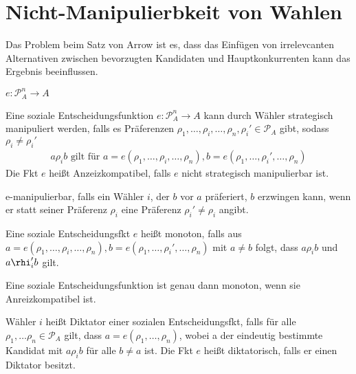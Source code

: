 \section{Nicht-Manipulierbkeit von Wahlen}
Das Problem beim Satz von Arrow ist es, dass das Einfügen von irrelevcanten Alternativen zwischen bevorzugten Kandidaten und Hauptkonkurrenten kann das Ergebnis beeinflussen. 

\begin{defi}
	$e: \mathcal{P}_A^n \rightarrow A$
\end{defi}

\begin{defi}
	Eine soziale Entscheidungsfunktion $e: \mathcal{P}_A^n \rightarrow A$ kann durch Wähler strategisch manipuliert werden, falls es Präferenzen $\rho_1, \dots, \rho_i, \dots, \rho_n, \rho_i' \in \mathcal{P}_A$ gibt, sodass $\rho_i \neq \rho_i'$ 
	\begin{align*}
		a \rho_i b \text{ gilt für }  a=e(\rho_1, \dots, \rho_i, \dots, \rho_n), b=e(\rho_1, \dots, \rho_i', \dots, \rho_n)
	\end{align*} 
	Die Fkt $e$ heißt Anzeizkompatibel, falls $e$ nicht strategisch manipulierbar ist. 
\end{defi}

\begin{rem}
	e-manipulierbar, falls ein Wähler $i$, der $b$ vor $a$ präferiert, $b$ erzwingen kann, wenn er statt seiner Präferenz $\rho_i$ eine Präferenz $\rho_i' \neq \rho_i$ angibt.  
\end{rem}

\begin{defi}[Monotonie]
	Eine soziale Entscheidungsfkt $e$ heißt monoton, falls aus 
	$ a=e(\rho_1, \dots, \rho_i, \dots, \rho_n), b=e(\rho_1, \dots, \rho_i', \dots, \rho_n)$ mit $a \neq b$ folgt, dass $a \rho_i b$ und $a \rhi_i' b$ gilt. 
\end{defi}

\begin{thm}
	Eine soziale Entscheidungsfunktion ist genau dann monoton, wenn sie Anreizkompatibel ist. 
\end{thm}

\begin{defi}
	Wähler $i$ heißt Diktator einer sozialen Entscheidungsfkt, falls für alle $\rho_1, \dots \rho_n \in \mathcal{P}_A$ gilt, dass $ a=e(\rho_1, \dots, \rho_n)$, wobei a der eindeutig bestimmte Kandidat mit $a \rho_i b$ für alle $b \neq a$ ist. Die Fkt $e$ heißt diktatorisch, falls er einen Diktator besitzt. 
\end{defi}

